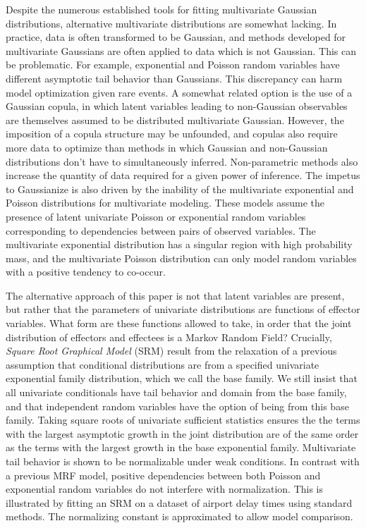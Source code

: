 \documentclass{samkoelleprelimworking}
\begin{document}
Despite the numerous established tools for fitting multivariate Gaussian distributions, alternative multivariate distributions are somewhat lacking.  In practice, data is often transformed to be Gaussian, and methods developed for multivariate Gaussians are often applied to data which is not Gaussian.  This can be problematic.  For example, exponential and Poisson random variables have different asymptotic tail behavior than Gaussians.  This discrepancy can harm model optimization given rare events.  A somewhat related option is the use of a Gaussian copula, in which latent variables leading to non-Gaussian observables are themselves assumed to be distributed multivariate Gaussian.  However, the imposition of a copula structure may be unfounded, and copulas also require more data to optimize than methods in which Gaussian and non-Gaussian distributions don't have to simultaneously inferred.  Non-parametric methods also increase the quantity of data required for a given power of inference.  The impetus to Gaussianize is also driven by the inability of the multivariate exponential and Poisson distributions for multivariate modeling.  These models assume the presence of latent univariate Poisson or exponential random variables corresponding to dependencies between pairs of observed variables.   The multivariate exponential distribution has a singular region with high probability mass, and the multivariate Poisson distribution can only model random variables with a positive tendency to co-occur.

The alternative approach of this paper is not that latent variables are present, but rather that the parameters of univariate distributions are functions of effector variables.  What form are these functions allowed to take, in order that the joint distribution of effectors and effectees is a Markov Random Field?  Crucially, \textit{Square Root Graphical Model} (SRM) result from the relaxation of a previous assumption that conditional distributions are from a specified univariate exponential family distribution, which we call the base family.  We still insist that all univariate conditionals have tail behavior and domain from the base family, and that independent random variables have the option of being from this base family.  Taking square roots of univariate sufficient statistics ensures the the terms with the largest asymptotic growth in the joint distribution are of the same order as the terms with the largest growth in the base exponential family. Multivariate tail behavior is shown to be normalizable under weak conditions.  In contrast with a previous MRF model, positive dependencies between both Poisson and exponential random variables do not interfere with normalization. This is illustrated by fitting an SRM on a dataset of airport delay times using standard methods.  The normalizing constant is approximated to allow model comparison.
\end{document}
